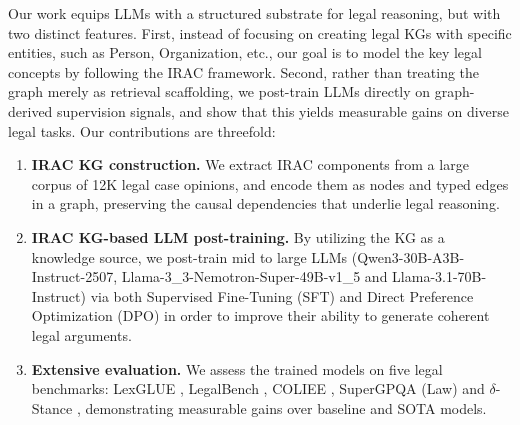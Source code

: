 Our work equips LLMs with a structured substrate for legal reasoning, but with two distinct features. First, instead of focusing on creating legal KGs with specific entities, such as Person, Organization, etc., our goal is to model the key legal concepts by following the IRAC framework. Second, rather than treating the graph merely as retrieval scaffolding, we post-train LLMs directly on graph-derived supervision signals, and show that this yields measurable gains on diverse legal tasks. Our contributions are threefold:
\begin{enumerate}
    \item \textbf{IRAC KG construction.} We extract IRAC components from a large corpus of 12K legal case opinions, and encode them as nodes and typed edges in a graph, preserving the causal dependencies that underlie legal reasoning.
    
    \item \textbf{IRAC KG-based LLM post-training.} By utilizing the KG as a knowledge source, we post-train mid to large LLMs (Qwen3-30B-A3B-Instruct-2507, Llama-3\_3-Nemotron-Super-49B-v1\_5 and Llama-3.1-70B-Instruct) via both Supervised Fine-Tuning (SFT) and Direct Preference Optimization (DPO) \cite{DBLP:conf/nips/RafailovSMMEF23} in order to improve their ability to generate coherent legal arguments.
    
    \item \textbf{Extensive evaluation.} We assess the trained models on five legal benchmarks: LexGLUE \cite{DBLP:journals/corr/abs-2304-12202}, LegalBench \cite{DBLP:conf/nips/GuhaNHRCKCPWRZT23}, COLIEE \cite{DBLP:journals/rss/RabeloGKKYS22}, SuperGPQA (Law) \cite{DBLP:journals/corr/abs-2502-14739} and $\delta$-Stance \cite{DBLP:conf/acl/GuptaR025}, demonstrating measurable gains over baseline and SOTA models.
\end{enumerate}

